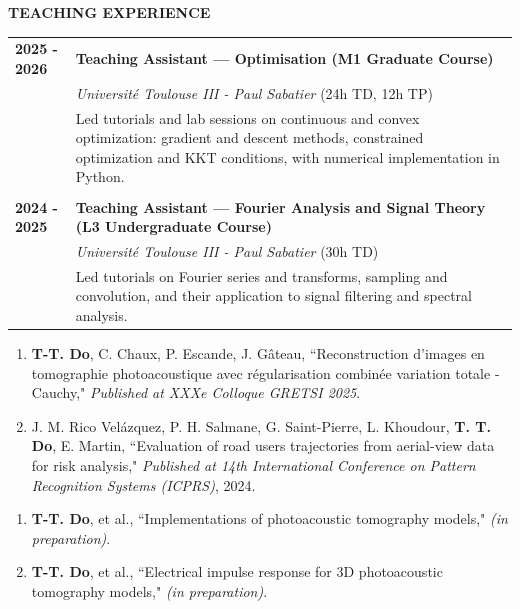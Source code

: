 \documentclass[a4paper,10pt]{article}
\begin{document}
\bigskip
\begin{center}\begin{large}
\textbf{TEACHING EXPERIENCE}
\end{large}\end{center}
\medskip
\begin{tabular}{p{3cm}p{13cm}}
    {\bf 2025 - 2026} & {\bf Teaching Assistant --- Optimisation (M1 Graduate Course)} \\
    & \emph{Université Toulouse III - Paul Sabatier} (24h TD, 12h TP) \\
    & Led tutorials and lab sessions on continuous and convex optimization: gradient and descent methods, constrained optimization and KKT conditions, with numerical implementation in Python. \\
    \vspace{0.15cm}\\
    {\bf 2024 - 2025} & {\bf Teaching Assistant --- Fourier Analysis and Signal Theory (L3 Undergraduate Course)} \\
    & \emph{Université Toulouse III - Paul Sabatier} (30h TD) \\
    & Led tutorials on Fourier series and transforms, sampling and convolution, and their application to signal filtering and spectral analysis.
\end{tabular}


\bigskip
\begin{enumerate}[leftmargin=*, label=\arabic*.]
    \item \textbf{T-T. Do}, C. Chaux, P. Escande, J. Gâteau, ``Reconstruction d’images en tomographie photoacoustique avec régularisation combinée variation totale - Cauchy," \emph{Published at XXXe Colloque GRETSI 2025}.

    \item J. M. Rico Velázquez, P. H. Salmane, G. Saint-Pierre, L. Khoudour, \textbf{T. T. Do}, E. Martin, ``Evaluation of road users trajectories from aerial-view data for risk analysis," \emph{Published at 14th International Conference on Pattern Recognition Systems (ICPRS)}, 2024.
\end{enumerate}

\medskip
{}
\begin{enumerate}[leftmargin=*, label=\arabic*.]
    \item \textbf{T-T. Do}, et al., ``Implementations of photoacoustic tomography models," \emph{(in preparation)}.
    \item \textbf{T-T. Do}, et al., ``Electrical impulse response for 3D photoacoustic tomography models," \emph{(in preparation)}.
\end{enumerate}
\end{document}
